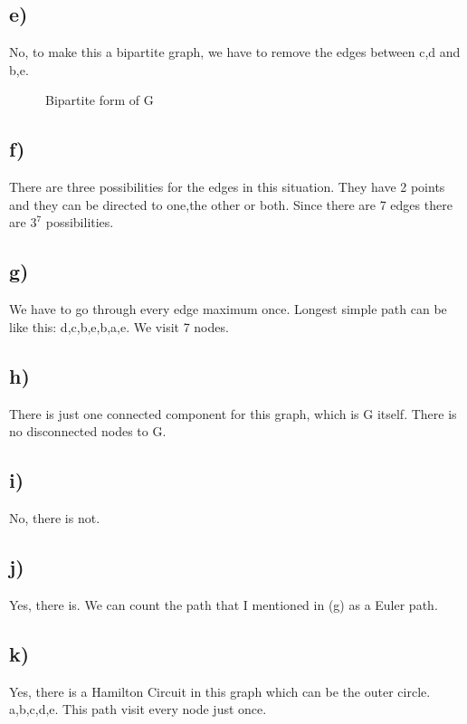 \documentclass[12pt]{article}
\begin{document}
\subsection*{e)}
No, to make this a bipartite graph, we have to remove the edges between c,d and b,e.
\begin{figure}[H]
	\centering
	\caption{Bipartite form of G}	
	\label{fig:g2}
\end{figure}

\subsection*{f)}
There are three possibilities for the edges in this situation. They have 2 points and they can be directed to one,the other or both. Since there are 7 edges there are $3^7$ possibilities.
\subsection*{g)}
We have to go through every edge maximum once. Longest simple path can be like this: d,c,b,e,b,a,e. We visit 7 nodes.
\subsection*{h)}
There is just one connected component for this graph, which is G itself. There is no disconnected nodes to G.
\subsection*{i)}
No, there is not.
\subsection*{j)}
Yes, there is. We can count the path that I mentioned in (g) as a Euler path.
\subsection*{k)}
Yes, there is a Hamilton Circuit in this graph which can be the outer circle. a,b,c,d,e. This path visit every node just once.
\end{document}
